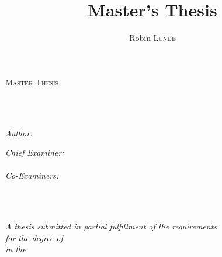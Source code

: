 \documentclass[
11pt, %
english, %
singlespacing, %
headsepline, %
]{MastersDoctoralThesis} %
\title{Master's Thesis} %
\author{Robin \textsc{Lunde}} %
\begin{document}
\frontmatter %

\pagestyle{plain} %


\begin{titlepage}
\begin{center}

\vspace*{.06\textheight}
{\scshape\LARGE \univname\par}\vspace{1.5cm} %
\textsc{\Large Master Thesis}\\[0.5cm] %

\HRule \\[0.4cm] %
{\huge \bfseries \ttitle\par}\vspace{0.4cm} %
\HRule \\[1.5cm] %
 
\begin{minipage}[t]{0.4\textwidth}
\begin{flushleft} \large
\emph{Author:}\\
\href{www.robinlunde.com}{\authorname} %
\end{flushleft}
\end{minipage}
\begin{minipage}[t]{0.4\textwidth}
\begin{flushright} \large
\emph{Chief Examiner:} \\
\href{https://vu.sfc.keio.ac.jp/faculty_profile/cgi/f_profile_e.cgi?id=4da5362a9eebedf5}{\supname}\\ %
\emph{Co-Examiners:} \\
\examname\\
\end{flushright}
\end{minipage}\\[3cm]
 
\vfill

\large \textit{A thesis submitted in partial fulfillment of the requirements\\ for the degree of \degreename}\\[0.3cm] %
\textit{in the}\\[0.4cm]
\deptname\\[2cm] %
 

\end{center}
\end{titlepage}
\end{document}
